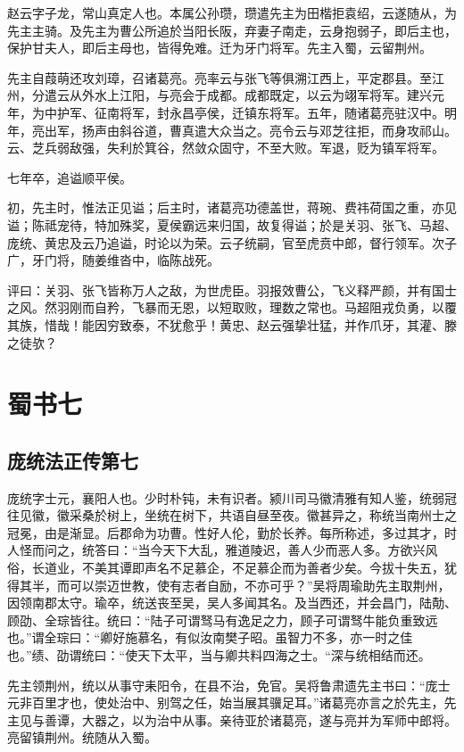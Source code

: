 \documentclass[12pt,UTF8]{ctexbook}
\begin{document}
赵云字子龙，常山真定人也。本属公孙瓒，瓒遣先主为田楷拒袁绍，云遂随从，为先主主骑。及先主为曹公所追於当阳长阪，弃妻子南走，云身抱弱子，即后主也，保护甘夫人，即后主母也，皆得免难。迁为牙门将军。先主入蜀，云留荆州。

先主自葭萌还攻刘璋，召诸葛亮。亮率云与张飞等俱溯江西上，平定郡县。至江州，分遣云从外水上江阳，与亮会于成都。成都既定，以云为翊军将军。建兴元年，为中护军、征南将军，封永昌亭侯，迁镇东将军。五年，随诸葛亮驻汉中。明年，亮出军，扬声由斜谷道，曹真遣大众当之。亮令云与邓芝往拒，而身攻祁山。云、芝兵弱敌强，失利於箕谷，然敛众固守，不至大败。军退，贬为镇军将军。

七年卒，追谥顺平侯。

初，先主时，惟法正见谥；后主时，诸葛亮功德盖世，蒋琬、费祎荷国之重，亦见谥；陈祗宠待，特加殊奖，夏侯霸远来归国，故复得谥；於是关羽、张飞、马超、庞统、黄忠及云乃追谥，时论以为荣。云子统嗣，官至虎贲中郎，督行领军。次子广，牙门将，随姜维沓中，临陈战死。

评曰：关羽、张飞皆称万人之敌，为世虎臣。羽报效曹公，飞义释严颜，并有国士之风。然羽刚而自矜，飞暴而无恩，以短取败，理数之常也。马超阻戎负勇，以覆其族，惜哉！能因穷致泰，不犹愈乎！黄忠、赵云强挚壮猛，并作爪牙，其灌、滕之徒欤？

\part{蜀书七}
\chapter{庞统法正传第七}

庞统字士元，襄阳人也。少时朴钝，未有识者。颍川司马徽清雅有知人鉴，统弱冠往见徽，徽采桑於树上，坐统在树下，共语自昼至夜。徽甚异之，称统当南州士之冠冕，由是渐显。后郡命为功曹。性好人伦，勤於长养。每所称述，多过其才，时人怪而问之，统答曰：“当今天下大乱，雅道陵迟，善人少而恶人多。方欲兴风俗，长道业，不美其谭即声名不足慕企，不足慕企而为善者少矣。今拔十失五，犹得其半，而可以崇迈世教，使有志者自励，不亦可乎？”吴将周瑜助先主取荆州，因领南郡太守。瑜卒，统送丧至吴，吴人多闻其名。及当西还，并会昌门，陆勣、顾劭、全琮皆往。统曰：“陆子可谓驽马有逸足之力，顾子可谓驽牛能负重致远也。”谓全琮曰：“卿好施慕名，有似汝南樊子昭。虽智力不多，亦一时之佳也。”绩、劭谓统曰：“使天下太平，当与卿共料四海之士。“深与统相结而还。

先主领荆州，统以从事守耒阳令，在县不治，免官。吴将鲁肃遗先主书曰：“庞士元非百里才也，使处治中、别驾之任，始当展其骥足耳。”诸葛亮亦言之於先主，先主见与善谭，大器之，以为治中从事。亲待亚於诸葛亮，遂与亮并为军师中郎将。亮留镇荆州。统随从入蜀。
\end{document}
